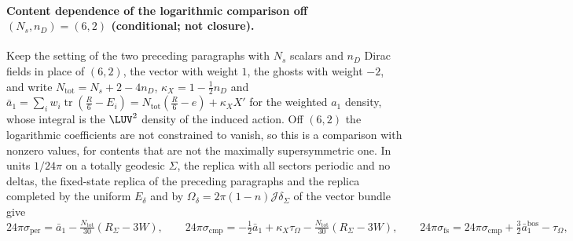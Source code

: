 \paragraph{Content dependence of the logarithmic comparison off \((N_s,n_D)=(6,2)\) (conditional; not closure).}
Keep the setting of the two preceding paragraphs with \(N_s\) scalars and \(n_D\) Dirac fields in place of \((6,2)\), the vector with weight \(1\), the ghosts with weight \(-2\), and write \(N_{\mathrm{tot}}=N_s+2-4n_D\), \(\kappa_X=1-\tfrac12n_D\) and \(\bar a_1=\sum_iw_i\operatorname{tr}(\tfrac R6-E_i)=N_{\mathrm{tot}}(\tfrac R6-e)+\kappa_XX'\) for the weighted \(a_1\) density, whose integral is the \(\LUV^2\) density of the induced action. Off \((6,2)\) the logarithmic coefficients are not constrained to vanish, so this is a comparison with nonzero values, for contents that are not the maximally supersymmetric one. In units \(1/24\pi\) on a totally geodesic \(\Sigma\), the replica with all sectors periodic and no deltas, the fixed-state replica of the preceding paragraphs and the replica completed by the uniform \(E_\delta\) and by \(\Omega_\delta=2\pi(1-n)\mathcal J\delta_\Sigma\) of the vector bundle give
\[
  24\pi\sigma_{\mathrm{per}}=\bar a_1-\tfrac{N_{\mathrm{tot}}}{30}(R_\Sigma-3W),\qquad
  24\pi\sigma_{\mathrm{cmp}}=-\tfrac12\bar a_1+\kappa_X\tau_\Omega-\tfrac{N_{\mathrm{tot}}}{30}(R_\Sigma-3W),\qquad
  24\pi\sigma_{\mathrm{fs}}=24\pi\sigma_{\mathrm{cmp}}+\tfrac32\bar a_1^{\mathrm{bos}}-\tau_\Omega ,
\]
